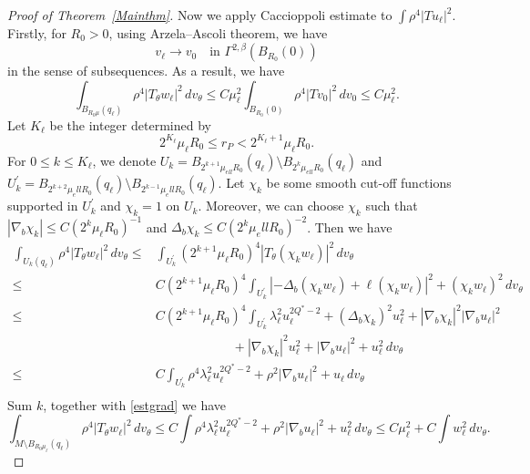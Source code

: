 \documentclass[11pt]{article}
\numberwithin{equation}{section}
\numberwithin{equation}{section}
\begin{document}
\begin{proof}[Proof of Theorem~\ref{Mainthm}]
		Now we apply  Caccioppoli estimate to \(\int \rho^4|Tu_\ell|^2\). Firstly, for \(R_0 > 0\), using Arzela--Ascoli theorem, we have
		\[
		v_\ell \to v_0 \quad \text{in } \Gamma^{2,\beta}(B_{R_0}(0))
		\]
		in the sense of subsequences. As a result, we have
		\begin{equation}\label{estTcentre}
			\int_{B_{R_0\mu}(q_\ell)} \rho^4|T_\theta w_\ell|^2\,dv_\theta \le C \mu_\ell^2 \int_{B_{R_0}(0)} \rho^4|T v_0|^2\,dv_0 \le C\mu_\ell^2.
		\end{equation}
		Let \(K_\ell\) be the integer determined by
		\[
		2^{K_\ell}\mu_\ell R_0\le r_P<2^{K_\ell+1}\mu_\ell R_0 .
		\]
		For \(0\le k\le K_\ell\), we denote \(U_k = B_{2^{k+1}\mu_{ell
		} R_0}(q_\ell)\setminus B_{2^{k}\mu_{ell} R_0}(q_\ell)\) and \(U_k^\prime = B_{2^{k+2}\mu_ell R_0}(q_{\ell})\setminus B_{2^{k-1}\mu_ell R_0}(q_{\ell})\). Let \(\chi_k\) be some smooth cut-off functions supported in \(U_k^\prime\) and \(\chi_k = 1\) on \(U_k\). Moreover, we can choose \(\chi_k\) such that \(|\nabla_b \chi_k| \le C(2^k\mu_{\ell} R_0)^{-1}\) and \(\Delta_b \chi_k \le C(2^{k}\mu_ell R_0)^{-2}\). Then we have
		\begin{equation}
			\begin{aligned}
				\int_{{U_k}(q_{\ell})} \rho^4|T_\theta w_{\ell}|^2\,dv_\theta \le &\int_{U_k^\prime} (2^{k+1}\mu_{\ell} R_0)^4 | T_\theta (\chi_k w_{\ell})|^2\,dv_\theta\\
				\le &C (2^{k+1}\mu_{\ell} R_0)^4\int_{U_k^\prime} |- \Delta_b (\chi_k w_\ell) + \ell (\chi_k w_\ell)|^2 + (\chi_k w_\ell)^2\,dv_\theta\\
				\le &C (2^{k+1}\mu_{\ell} R_0)^4\int_{U_k^\prime} \lambda_\ell^2 u_\ell^{2Q^*-2} + (\Delta_b \chi_k)^2 u_\ell^2 + |\nabla_b \chi_k|^2 |\nabla_b u_\ell|^2\\
				& \qquad \qquad \qquad+ |\nabla_b \chi_k|^2u_\ell^2 + |\nabla_b u_\ell|^2 + u_\ell^2\,dv_\theta\\
				\le &C \int_{U_k^\prime} \rho^4 \lambda_\ell^2 u_\ell^{2Q^*-2} + \rho^2|\nabla_b u_\ell|^2 + u_\ell\,dv_\theta\\
			\end{aligned}
		\end{equation}
		Sum \(k\), together with \eqref{estgrad} we have
		\begin{equation}
			\int_{M\setminus B_{R_0\mu_\ell}(q_\ell)} \rho^4|T_\theta w_\ell|^2\,dv_\theta \le C \int \rho^4 \lambda_\ell^2 u_\ell^{2Q^*-2} + \rho^2|\nabla_b u_\ell|^2 + u_\ell^2\,dv_\theta \le C\mu_\ell^2 + C \int w_\ell^2\,dv_\theta.
		\end{equation}

\end{proof}
\end{document}
